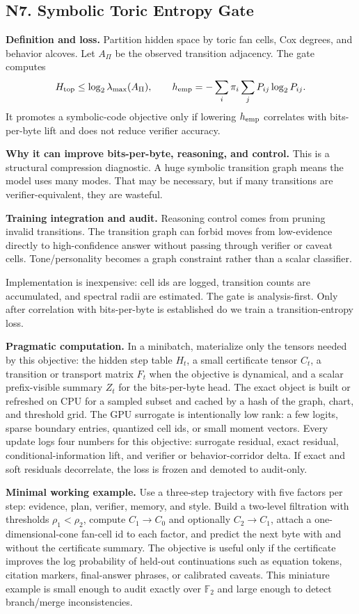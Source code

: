 \documentclass[10pt]{article}
\newcommand{\FF}{\mathbb{F}}
\numberwithin{equation}{section}
\begin{document}
\subsection{N7. Symbolic Toric Entropy Gate}
\noindent\textbf{Definition and loss.} Partition hidden space by toric fan cells, Cox degrees, and behavior alcoves. Let $A_\Pi$ be the observed transition adjacency. The gate computes
\[
H_{\rm top}\le \log_2\lambda_{\max}(A_\Pi),\qquad h_{\rm emp}=-\sum_i\pi_i\sum_j P_{ij}\log_2P_{ij}.
\]
It promotes a symbolic-code objective only if lowering $h_{\rm emp}$ correlates with bits-per-byte lift and does not reduce verifier accuracy.

\noindent\textbf{Why it can improve bits-per-byte, reasoning, and control.} This is a structural compression diagnostic. A huge symbolic transition graph means the model uses many modes. That may be necessary, but if many transitions are verifier-equivalent, they are wasteful.

\noindent\textbf{Training integration and audit.} Reasoning control comes from pruning invalid transitions. The transition graph can forbid moves from low-evidence directly to high-confidence answer without passing through verifier or caveat cells. Tone/personality becomes a graph constraint rather than a scalar classifier.

Implementation is inexpensive: cell ids are logged, transition counts are accumulated, and spectral radii are estimated. The gate is analysis-first. Only after correlation with bits-per-byte is established do we train a transition-entropy loss.

\noindent\textbf{Pragmatic computation.} In a minibatch, materialize only the tensors needed by this objective: the hidden step table $H_t$, a small certificate tensor $C_t$, a transition or transport matrix $F_t$ when the objective is dynamical, and a scalar prefix-visible summary $Z_t$ for the bits-per-byte head. The exact object is built or refreshed on CPU for a sampled subset and cached by a hash of the graph, chart, and threshold grid. The GPU surrogate is intentionally low rank: a few logits, sparse boundary entries, quantized cell ids, or small moment vectors. Every update logs four numbers for this objective: surrogate residual, exact residual, conditional-information lift, and verifier or behavior-corridor delta. If exact and soft residuals decorrelate, the loss is frozen and demoted to audit-only.

\noindent\textbf{Minimal working example.} Use a three-step trajectory with five factors per step: evidence, plan, verifier, memory, and style. Build a two-level filtration with thresholds $\rho_1<\rho_2$, compute $C_1\to C_0$ and optionally $C_2\to C_1$, attach a one-dimensional-cone fan-cell id to each factor, and predict the next byte with and without the certificate summary. The objective is useful only if the certificate improves the log probability of held-out continuations such as equation tokens, citation markers, final-answer phrases, or calibrated caveats. This miniature example is small enough to audit exactly over $\FF_2$ and large enough to detect branch/merge inconsistencies.
\end{document}
